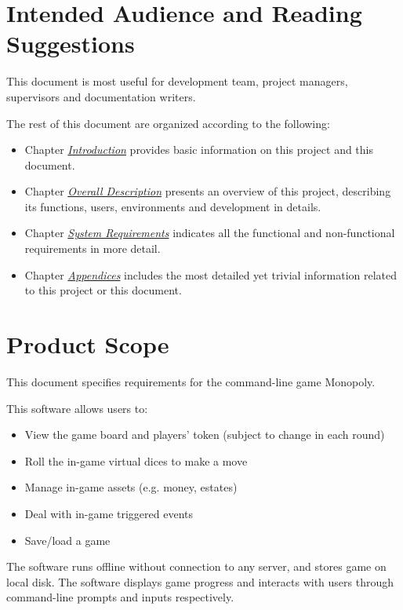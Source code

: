   \section{Intended Audience and Reading Suggestions}
    This document is most useful for development team, project managers, supervisors and documentation writers. \par
    The rest of this document are organized according to the following: \par
    \begin{itemize}
      \item Chapter \textit{\hyperref[ch:intro]{Introduction}} provides basic information on this project and this document.
      \item Chapter \textit{\hyperref[ch:overall-desc]{Overall Description}} presents an overview of this project, describing its functions, users, environments and development in details.
      \item Chapter \textit{\hyperref[ch:sys-req]{System Requirements}} indicates all the functional and non-functional requirements in more detail.
      \item Chapter \textit{\hyperref[ch:apdx]{Appendices}} includes the most detailed yet trivial information related to this project or this document.
    \end{itemize}

  \section{Product Scope}
    This document specifies requirements for the command-line game Monopoly. \par
    This software allows users to: \par
    \begin{itemize}
      \item View the game board and players' token (subject to change in each round)
      \item Roll the in-game virtual dices to make a move
      \item Manage in-game assets (e.g. money, estates)
      \item Deal with in-game triggered events
      \item Save/load a game
    \end{itemize}
    The software runs offline without connection to any server, and stores game on local disk. The software displays game progress and interacts with users through command-line prompts and inputs respectively. 

